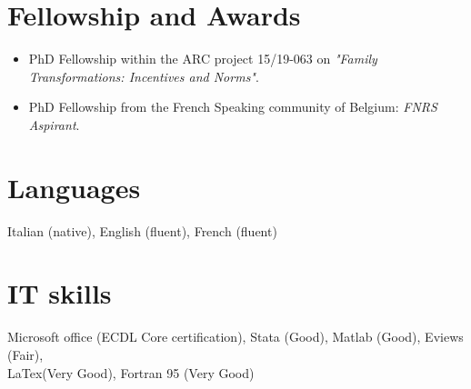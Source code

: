 \documentclass[10pt]{article} %
\begin{document}
\section{Fellowship and Awards}
\begin{itemize}
\item PhD Fellowship within the ARC project 15/19-063 on \textit{"Family Transformations: Incentives and Norms"}.
\item PhD Fellowship from the French Speaking community of Belgium:  \textit{FNRS Aspirant}.
\end{itemize}




\section{Languages}
Italian (native), English (fluent), French (fluent)



\section{IT skills}
Microsoft office (ECDL Core certification), Stata (Good), Matlab (Good), Eviews (Fair),\\ LaTex(Very Good), Fortran 95 (Very Good)
\end{document}
